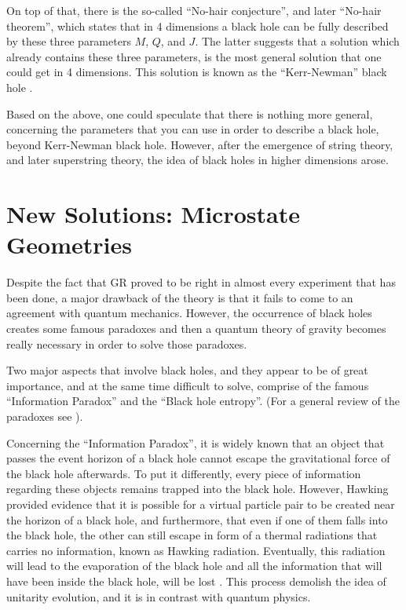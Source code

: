 \documentclass[a4paper,notitlepage]{report}
\begin{document}
On top of that, there is the so-called ``No-hair conjecture'', and later ``No-hair theorem'', which states that in 4 dimensions a black hole can be fully described by these three  parameters $M$, $Q$, and $J$. The latter suggests that a solution which already contains these three parameters, is the most general solution that one could get in 4 dimensions. This solution is known as the ``Kerr-Newman'' black hole \cite{kerr1963gravitational,newman1965note,newman1965metric}.

Based on the above, one could speculate that there is nothing more general, concerning the parameters that you can use in order to describe a black hole, beyond Kerr-Newman black hole. However, after the emergence of string theory, and later superstring theory, the idea of black holes in higher dimensions arose. 

\section{New Solutions: Microstate Geometries}

Despite the fact that GR proved to be right in almost every experiment that has been done, a major drawback of the theory is that it fails to come to an agreement with quantum mechanics. However, the occurrence of black holes creates some famous paradoxes and then a quantum theory of gravity becomes really necessary in order to solve those paradoxes.

Two major aspects that involve black holes, and they appear to be of great importance, and at the same time difficult to solve, comprise of the famous ``Information Paradox'' and the ``Black hole entropy''. (For a general review of the paradoxes see   \cite{bena2008black,strominger1996microscopic,skenderis2000black}).

Concerning the ``Information Paradox'', it is widely known that an object that passes the event horizon of a black hole cannot escape the gravitational force of the black hole afterwards. To put it differently, every piece of information regarding these objects remains trapped into the black hole. However, Hawking provided evidence that it is possible for a virtual particle pair to be created near the horizon of a black hole, and furthermore, that even if one of them falls into the black hole, the other can still escape in form of a thermal radiations that carries no information, known as Hawking radiation. Eventually, this radiation will lead to the evaporation of the black hole and all the information that will have been inside the black hole, will be lost \cite{hawking1974black}. This process demolish the idea of unitarity evolution, and it is in contrast with quantum physics.
\end{document}
